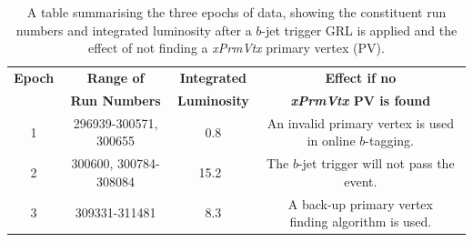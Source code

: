 \begin{table}[!htb]
   \vspace{-0.5em}
  \begin{center}
  \begin{tabular}{ | c || c | c | c |}
    \hline			
    \textbf{Epoch}                     & \textbf{Range of}           & \textbf{Integrated} & \textbf{Effect if no } \\ 
    \textbf{}                     & \textbf{Run Numbers}           & \textbf{Luminosity} & \textbf{\textit{xPrmVtx} PV is found} \\ \hline
    \parbox[c]{0.2cm}{\vspace{0.5em}1} & \parbox[t]{4 cm} {296939-300571, 300655} & \parbox[c]{1cm}{\vspace{0.5em}~0.8~\ifb{}}
    & \parbox[t]{4.5cm} {An invalid primary vertex \\is used in online $b$-tagging. \vspace{0.2em}} \\
    \hline                                                                                                                            
    \parbox[c]{0.2cm}{\vspace{0.5em}2} & \parbox[t]{4 cm} {300600, 300784-308084} & \parbox[c]{1.2cm}{\vspace{0.5em}15.2~\ifb{}}
    & \parbox[t]{4.5cm}{The $b$-jet trigger will not \\pass the event. \vspace{0.2em} }\\
    \hline                                                                                                                            
    \parbox[c]{0.2cm}{\vspace{0.5em}3} &  \parbox[t]{4 cm} {309331-311481}        & \parbox[c]{1cm}{\vspace{0.5em}~8.3~\ifb{}}
    & \parbox[t]{4.5cm} {A back-up primary vertex \\ finding algorithm is used.\vspace{0.2em}} \\
    \hline
  \end{tabular}
  \end{center}
  \vspace{-0.5em}
  \caption[A table summarising the three epochs of data, showing the constituent run numbers and integrated luminosity after a $b$-jet trigger GRL is applied and the
    effect of not finding a \textit{xPrmVtx} primary vertex. ]
          {A table summarising the three epochs of data, showing the constituent run numbers and integrated luminosity after a $b$-jet trigger GRL is applied and the
            effect of not finding a \textit{xPrmVtx} primary vertex (PV).}
  \label{tab:trig-epochs}
  \vspace{-0.5em}
\end{table}


